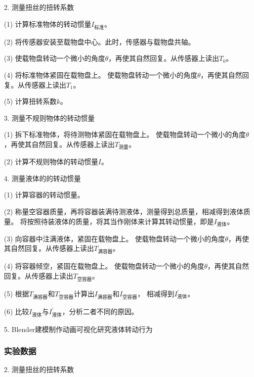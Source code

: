 \documentclass[12pt,hyperref,a4paper,UTF8]{ctexart}
\begin{document}
2. 测量扭丝的扭转系数

(1) 计算标准物体的转动惯量$ I_{\text{标准}} $。

(2) 将传感器安装至载物盘中心。此时，传感器与载物盘共轴。

(3) 使载物盘转动一个微小的角度$ \theta $，再使其自然回复。从传感器上读出$ T_0 $。

(4) 将标准物体紧固在载物盘上。
使载物盘转动一个微小的角度$ \theta $，再使其自然回复。从传感器上读出$ T_1 $。

(5) 计算扭转系数$ k $。

3. 测量不规则物体的转动惯量

(1) 拆下标准物体，将待测物体紧固在载物盘上。
使载物盘转动一个微小的角度$ \theta $，再使其自然回复。从传感器上读出$ T_{\text{测量}} $。

(2) 计算不规则物体的转动惯量$ I $。

4. 测量液体的的转动惯量

(1) 计算容器的转动惯量。

(2) 称量空容器质量，再将容器装满待测液体，测量得到总质量，相减得到液体质量。
将按照待装液体的质量，将其当作刚体来计算其转动惯量，即是$ I_{\text{液体}} $。

(3) 向容器中注满液体，紧固在载物盘上。
使载物盘转动一个微小的角度$ \theta $，再使其自然回复。从传感器上读出$ T_{\text{满容器}} $。

(4) 将容器倾空，紧固在载物盘上。
使载物盘转动一个微小的角度$ \theta $，再使其自然回复。从传感器上读出$ T_{\text{空容器}} $。

(5) 根据$ T_{\text{满容器}} $和$ T_{\text{空容器}} $计算出$ I_{\text{满容器}} $和$ I_{\text{空容器}} $，
相减得到$ I_{\text{液体}}^{'} $。

(6) 比较$ I_{\text{液体}} $与$ I_{\text{液体}}^{'} $，分析二者不同的原因。

5. Blender建模制作动画可视化研究液体转动行为

\subsubsection{实验数据}

2. 测量扭丝的扭转系数
\end{document}
